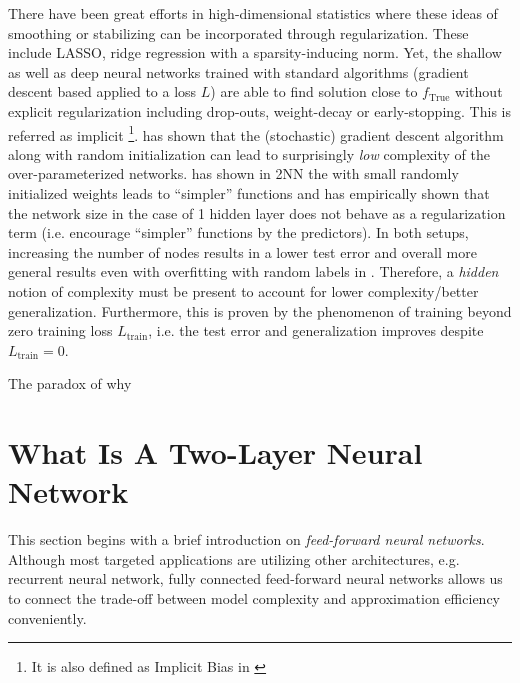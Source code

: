 There have been great efforts in high-dimensional statistics where these ideas
of smoothing or stabilizing can be incorporated through regularization. These
include LASSO, ridge regression with a sparsity-inducing norm. Yet, the shallow
as well as deep neural networks \cite{neyshaburSearchRealInductive2015,
maennelGradientDescentQuantizes2018, liLearningOverparameterizedNeural2019,
kuboImplicitRegularizationOverparameterized2019,
neyshaburImplicitRegularizationDeep2017} trained with standard algorithms
(gradient descent based applied to a loss $L$) are able to find solution close
to $f_{\text{True}}$ without explicit regularization including drop-outs,
weight-decay or early-stopping. This is referred as \gls{implicit} \footnote{ It
is also defined as Implicit Bias in \cite{soudryImplicitBiasGradient2022} }.
\cite{kuboImplicitRegularizationOverparameterized2019} has shown that the
(stochastic) gradient descent algorithm along with random initialization can
lead to surprisingly \textit{low} complexity of the over-parameterized networks.
\cite{maennelGradientDescentQuantizes2018} has shown in 2NN the with small
randomly initialized weights leads to ``simpler'' functions and
\cite{maennelGradientDescentQuantizes2018, neyshaburSearchRealInductive2015} has
empirically shown that the network size in the case of 1 hidden layer does not
behave as a regularization term (i.e. encourage ``simpler'' functions by the
predictors). In both setups, increasing the number of nodes results in a lower
test error and overall more general results even with overfitting with random
labels in \cite{neyshaburSearchRealInductive2015}. Therefore, a \textit{hidden}
notion of complexity must be present to account for lower complexity/better
generalization. Furthermore, this is proven by the phenomenon of training beyond
zero training loss \TOCITE $L_{\text{train}}$, i.e. the test error and
generalization improves despite $L_{\text{train}} = 0$.

The paradox of why 


\section{What Is A Two-Layer Neural Network}

This section begins with a brief introduction on \textit{feed-forward neural
networks}. Although most targeted applications are utilizing other architectures,
e.g. recurrent neural network, fully connected feed-forward neural
networks allows us to connect the trade-off between model complexity and
approximation efficiency conveniently.

